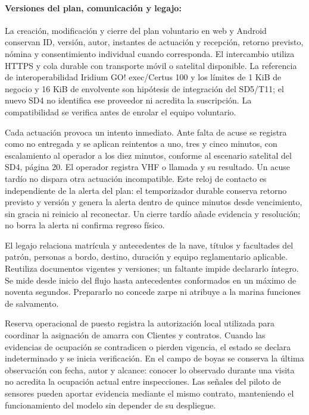 \paragraph{Versiones del plan, comunicación y legajo:}
La creación, modificación y cierre del plan voluntario en web y Android conservan ID, versión, autor, instantes de actuación y recepción, retorno previsto, nómina y consentimiento individual cuando corresponda. El intercambio utiliza HTTPS y cola durable con transporte móvil o satelital disponible. La referencia de interoperabilidad Iridium GO! exec/Certus 100 y los límites de 1 KiB de negocio y 16 KiB de envolvente son hipótesis de integración del SD5/T11; el nuevo SD4 no identifica ese proveedor ni acredita la suscripción. La compatibilidad se verifica antes de enrolar el equipo voluntario.

Cada actuación provoca un intento inmediato. Ante falta de acuse se registra como no entregada y se aplican reintentos a uno, tres y cinco minutos, con escalamiento al operador a los diez minutos, conforme al escenario satelital del SD4, página 20. El operador registra VHF o llamada y su resultado. Un acuse tardío no dispara otra actuación incompatible. Este reloj de contacto es independiente de la alerta del plan: el temporizador durable conserva retorno previsto y versión y genera la alerta dentro de quince minutos desde vencimiento, sin gracia ni reinicio al reconectar. Un cierre tardío añade evidencia y resolución; no borra la alerta ni confirma regreso físico.

El legajo relaciona matrícula y antecedentes de la nave, títulos y facultades del patrón, personas a bordo, destino, duración y equipo reglamentario aplicable. Reutiliza documentos vigentes y versiones; un faltante impide declararlo íntegro. Se mide desde inicio del flujo hasta antecedentes conformados en un máximo de noventa segundos. Prepararlo no concede zarpe ni atribuye a la marina funciones de salvamento.

Reserva operacional de puesto registra la autorización local utilizada para coordinar la asignación de amarra con Clientes y contratos. Cuando las evidencias de ocupación se contradicen o pierden vigencia, el estado se declara indeterminado y se inicia verificación. En el campo de boyas se conserva la última observación con fecha, autor y alcance: conocer lo observado durante una visita no acredita la ocupación actual entre inspecciones. Las señales del piloto de sensores pueden aportar evidencia mediante el mismo contrato, manteniendo el funcionamiento del modelo sin depender de su despliegue.

